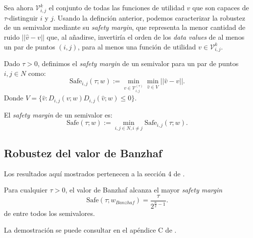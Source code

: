 Sea ahora $\mathcal{V}_{i,j}^{k}$ el conjunto de todas las funciones
de utilidad $v$ que son capaces de $\tau$-distinguir $i$ y $j$. 
Usando la definción anterior, podemos caracterizar la robustez de
un semivalor mediante su \textit{safety margin}, que representa la
menor cantidad de ruido $||\hat{v} - v||$ que, al añadirse,
invertiría el orden de los \textit{data values} de al menos un
par de puntos $(i,j)$, para al menos una función de utilidad $v \in
\mathcal{V}_{i,j}^{k}$.

\begin{definition}
  Dado $\tau > 0$, definimos el \emph{safety margin} 
  de un semivalor para un par de puntos $i,j \in N$ como:
  \begin{equation*}
    \text{Safe}_{i,j}(\tau;w):=\min_{v \in \mathcal{V}_{i,j}^{(\tau)}}
    \min_{\hat{v} \in V}
    ||\hat{v} - v||.
  \end{equation*}
  Donde $V = \{\hat{v}:D_{i,j}(v;w)D_{i,j}(\hat{v};w)\leq 0\}$.

  El \emph{safety margin} de un semivalor es: 
  \begin{equation*}
    \text{Safe}(\tau;w):=\min_{i,j \in N, i \neq j} \text{Safe}_{i,j}(\tau;w).
  \end{equation*}
\end{definition}



\subsection{Robustez del valor de Banzhaf}
Los resultados aquí mostrados pertenecen a la sección 4
de \cite{dataBanzhaf}.

\begin{theorem}
  Para cualquier $\tau > 0$, el valor de Banzhaf
  alcanza el mayor \textit{safety margin}
  \[
  \text{Safe}(\tau;w_{Banzhaf})=\frac{\tau}{2^{\frac{n}{2}-1}}.  
  \]
  de entre todos los semivalores.
\end{theorem}

La demostración se puede consultar en el apéndice
C de \cite{dataBanzhaf}.

\

